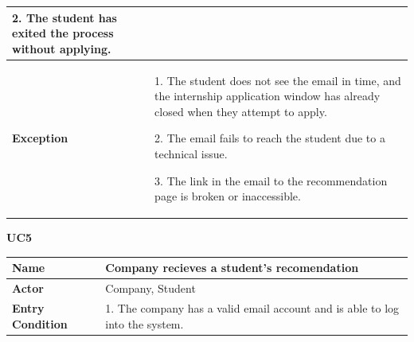 \begin{longtable}{|p{}|p{}|}
2. The student has exited the process without applying.\\
\hline
\textbf{Exception} &  
    1. The student does not see the email in time, and the internship application window has already closed when they attempt to apply.	
    
    2. The email fails to reach the student due to a technical issue.	
    
    3. The link in the email to the recommendation page is broken or inaccessible.\\
\hline
\end{longtable}



\textbf{UC5}

\begin{longtable}{|p{}|p{}|}
\hline
\textbf{Name} &  Company recieves a student's recomendation\\
\hline
\textbf{Actor} &  Company, Student\\
\hline
\textbf{Entry Condition} &  
1. The company has a valid email account and is able to log into the system.


\end{longtable}
